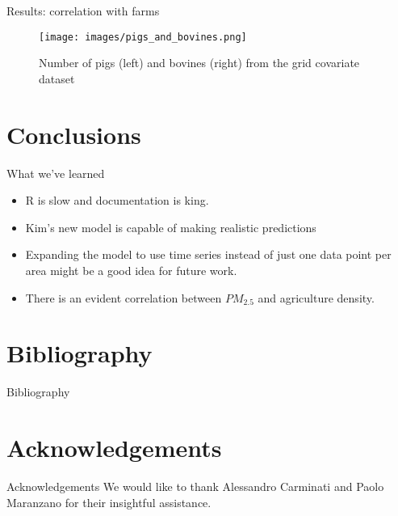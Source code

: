 \documentclass[10pt]{beamer}
\begin{document}
\begin{frame}{Results: correlation with farms}
    \begin{figure}
        \texttt{[image: images/pigs\_and\_bovines.png]}
        \caption{Number of pigs (left) and bovines (right) from the grid covariate dataset}
    \end{figure}
\end{frame}

\section{Conclusions}
\begin{frame}{What we've learned}
    \begin{itemize}
        \item R is slow and documentation is king.
        \item Kim's new model is capable of making realistic predictions
        \item Expanding the model to use time series instead of just one data point per area might be a good idea for future work.
        \item There is an evident correlation between $PM_{2.5}$ and agriculture density.
    \end{itemize}
\end{frame}

\section{Bibliography}

\begin{frame}{Bibliography}

    \printbibliography

\end{frame}

\section{Acknowledgements}
\begin{frame}{Acknowledgements}
    We would like to thank Alessandro Carminati and Paolo Maranzano for their insightful assistance.
\end{frame}
\end{document}
